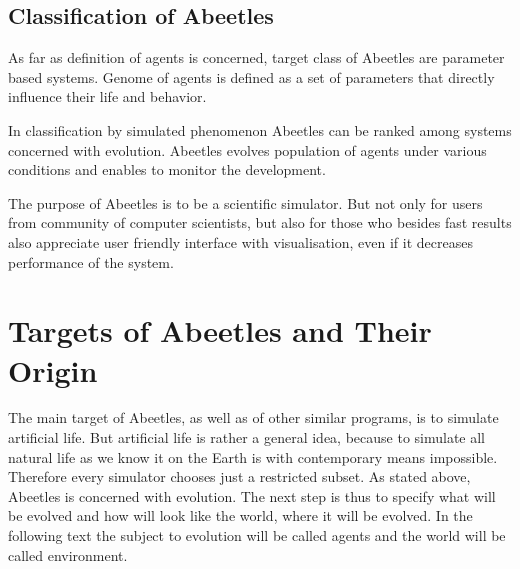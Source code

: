 \documentclass[a4paper,12pt]{report}
\begin{document}
\section{Classification of Abeetles}
As far as definition of agents is concerned, target class of Abeetles are parameter based systems. Genome of agents is defined as a set of parameters that  directly influence their life and behavior.

In classification by simulated phenomenon Abeetles can be ranked among systems concerned with evolution. Abeetles evolves population of agents under various conditions and enables to monitor the development.

The purpose of Abeetles is to be a scientific simulator. But not only for users from community of computer scientists, but also for those who besides fast results also appreciate user friendly interface with visualisation, even if it decreases performance of the system. 


\chapter{Targets of Abeetles and Their Origin}



The main target of Abeetles, as well as of other similar programs, is to simulate artificial life. But artificial life is rather a general idea, because to simulate all natural life as we know it on the Earth is with contemporary means impossible. Therefore every simulator chooses just a restricted subset. As stated above, Abeetles is concerned with evolution. The next step is thus to specify what will be evolved and how will look like the world, where it will be evolved. In the following text the subject to evolution will be called agents and the world will be called environment. 
\end{document}
